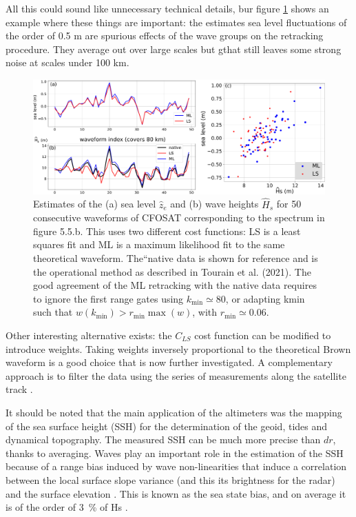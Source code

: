 All this could sound like unnecessary technical details, bur figure \ref{fig:alti_SWIM_fit} shows an example where these things are important: the estimates sea level fluctuations of the order of 0.5 m are spurious effects of the wave groups on the retracking procedure. They average out over large scales but gthat still leaves some strong noise at scales under 100 km. 
\begin{figure}[h!]
\centerline{\includegraphics[width=\textwidth]{FIGS_CH_SAT/SWIM_data_LS_vs_ML.pdf}}
  \caption{Estimates of the (a) sea level $\widehat{z}_e$ and (b) wave heights $\widehat{H}_s$ for 50 consecutive waveforms of CFOSAT corresponding to the spectrum in figure 5.5.b. This uses two different cost
functions: LS is a least squares  fit and ML is a maximum likelihood  fit to the same theoretical waveform. The“native data is shown for reference and is the operational method as described in Tourain et al. (2021). The good agreement of the ML retracking
with the native data requires to ignore the first range gates using $k_{\min}\simeq 80$, or adapting kmin such that $w (k_{\min}) > r_{\min} \max (w)$, with $r_{\min}\simeq  0.06$.
} \label{fig:alti_SWIM_fit}
\end{figure}



Other interesting alternative exists: the $C_{LS}$ cost function can be modified to introduce weights. Taking weights inversely proportional to the theoretical Brown waveform is a good choice that is now further investigated. A complementary approach is to  filter the data using the series of measurements along the satellite track \citep{Quilfen&Chapron2019}.



It should be noted that the main application of the altimeters was the mapping of the sea surface height (SSH) for the determination of the geoid, tides and dynamical topography. The measured
 SSH can be much more precise than $dr$, thanks to averaging. Waves play an important role in the estimation of the SSH because of a range bias induced by wave non-linearities that induce a correlation between the local surface slope variance (and this its brightness for the radar) and the surface elevation \citep{Jackson1979,Srokosz1986}. This is known as 
 the sea state bias, and on average it is of the order of
 3~\% of Hs \citep[e.g.][]{Minster&al.1992}. 
 
